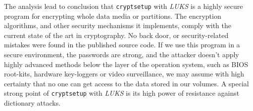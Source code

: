 The analysis lead to conclusion that {\tt cryptsetup} with {\it LUKS} is a highly secure program for encrypting whole data media or partitions.
The encryption algorithms, and other security mechanisms it implements, comply with the current state of the art in cryptography.
No back door, or security-related mistakes were found in the published source code.
If we use this program in a secure environment, the passwords are strong, and the attacker doesn't apply highly advanced methods below the layer of the operation system, such as BIOS root-kits, hardware key-loggers or video surveillance, we may assume with high certainty that no one can get access to the data stored in our volumes.
A special strong point of {\tt cryptsetup} with {\it LUKS} is its high power of resistance against dictionary attacks\cite{team2012security}.
